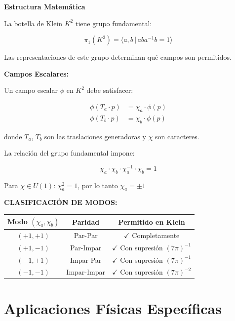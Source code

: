 \begin{nivelmatematico}
\textbf{Estructura Matemática}

La botella de Klein $K^2$ tiene grupo fundamental:

\begin{equation}
\pi_1(K^2) = \langle a, b \,|\, aba^{-1}b = 1 \rangle
\end{equation}

Las representaciones de este grupo determinan qué campos son permitidos.

\textbf{Campos Escalares:}

Un campo escalar $\phi$ en $K^2$ debe satisfacer:

\begin{align}
\phi(T_a \cdot p) &= \chi_a \cdot \phi(p)\\
\phi(T_b \cdot p) &= \chi_b \cdot \phi(p)
\end{align}

donde $T_a$, $T_b$ son las traslaciones generadoras y $\chi$ son caracteres.

La relación del grupo fundamental impone:

\begin{equation}
\chi_a \cdot \chi_b \cdot \chi_a^{-1} \cdot \chi_b = 1
\end{equation}

Para $\chi \in U(1)$: $\chi_a^2 = 1$, por lo tanto $\chi_a = \pm 1$
\end{nivelmatematico}

\textbf{CLASIFICACIÓN DE MODOS:}

\begin{center}
\begin{tabular}{ccc}
\toprule
\textbf{Modo} $(\chi_a, \chi_b)$ & \textbf{Paridad} & \textbf{Permitido en Klein} \\
\midrule
$(+1, +1)$ & Par-Par & $\checkmark$ Completamente \\
$(+1, -1)$ & Par-Impar & $\checkmark$ Con supresión $(7\pi)^{-1}$ \\
$(-1, +1)$ & Impar-Par & $\checkmark$ Con supresión $(7\pi)^{-1}$ \\
$(-1, -1)$ & Impar-Impar & $\checkmark$ Con supresión $(7\pi)^{-2}$ \\
\bottomrule
\end{tabular}
\end{center}


\section{Aplicaciones Físicas Específicas}

